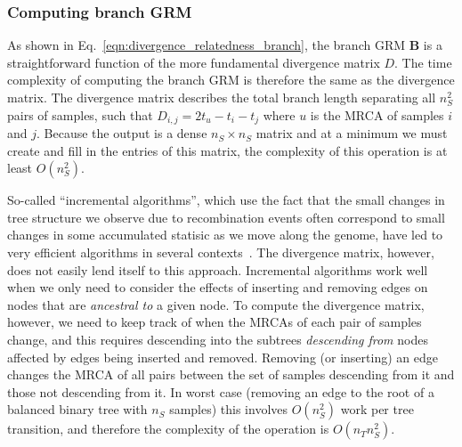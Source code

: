 
\subsubsection{Computing branch GRM}
As shown in Eq.~\eqref{eqn:divergence_relatedness_branch}, the branch GRM
$\mathbf{B}$ is a 
straightforward function of the more fundamental divergence matrix $D$.
The time complexity of computing the branch GRM is therefore the same as 
the divergence matrix.
The divergence matrix describes
the total branch length separating all $n_S^2$ pairs of samples, such 
that $D_{i,j} = 2t_u - t_i - t_j$ where $u$ is the MRCA of samples $i$ and $j$.
Because the output is a dense $n_S \times n_S$ matrix 
and at a minimum we must create and fill in the entries of this matrix,
the complexity of this operation is at least $O(n_S^2)$.

So-called ``incremental algorithms'', which use the fact that the 
small changes in tree structure we observe due to recombination events
often correspond to small changes in some accumulated statisic as 
we move along the genome,
have led to very efficient algorithms in several 
contexts~\citep{kelleher2016efficient,ralph2020efficiently,kelleher2020coalescent}. 
The divergence matrix, however, does not easily lend itself to this approach.
Incremental algorithms work well when we only need to consider the effects 
of inserting and removing edges on nodes that are \emph{ancestral to}
a given node. To compute the divergence matrix, however, we need to keep track
of when the MRCAs of each pair of samples change, and this requires 
descending into the subtrees \emph{descending from} nodes affected by 
edges being inserted and removed. Removing (or inserting) an edge changes the MRCA of 
all pairs between the set of samples descending from it 
and those not descending from it. In worst case (removing an edge to the 
root of a balanced binary tree with $n_S$ samples) this involves 
$O(n_S^2)$ work per tree transition, and therefore the complexity of the 
operation is $O(n_T n_S^2)$. 

